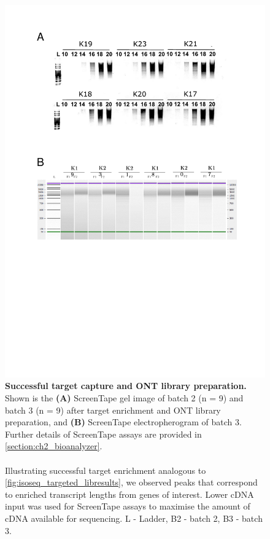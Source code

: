 \begin{figure}[!htp]
	\centering
	\vspace{20pt}
	\includegraphics[page=3,trim={0 17cm 0cm 0cm},clip,scale = 0.75]{Figures/TargetedTranscriptome_ppt.pdf}
	\captionsetup{width=0.95\textwidth}
	\caption[ONT targeted profiling - target capture \& library preparation]%
	{\textbf{Successful target capture and ONT library preparation.} Shown is the \textbf{(A)} ScreenTape gel image of batch 2 (n = 9) and batch 3 (n = 9) after target enrichment and ONT library preparation, and \textbf{(B)} ScreenTape electropherogram of batch 3. Further details of ScreenTape assays are provided in \cref{section:ch2_bioanalyzer}. 
	\\
	\\
	Illustrating successful target enrichment analogous to \cref{fig:isoseq_targeted_libresults}, we observed peaks that correspond to enriched transcript lengths from genes of interest. Lower cDNA input was used for ScreenTape assays to maximise the amount of cDNA available for sequencing. L - Ladder, B2 - batch 2, B3 - batch 3.}  
	\label{fig:ONT_targeted_libresults}
\end{figure}

